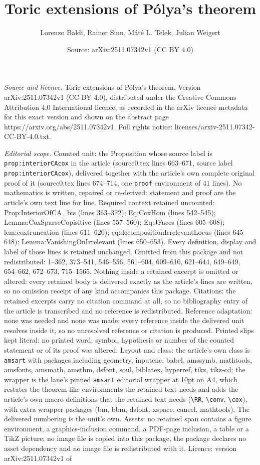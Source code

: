 \documentclass[10pt,a4paper]{amsart}
\title[Toric extensions of P\'olya's theorem]{Toric extensions of P\'olya's theorem}
\author{Lorenzo Baldi, Rainer Sinn, M\'at\'e L. Telek, Julian Weigert}
\date{Source: arXiv:2511.07342v1 (CC BY 4.0)}
\begin{document}
\maketitle

\noindent\emph{Source and licence.} Toric extensions of P\'olya's theorem. Version arXiv:2511.07342v1 (CC BY 4.0), distributed under the Creative Commons Attribution 4.0 International licence, as recorded in the arXiv licence metadata for this exact version and shown on the abstract page https://arxiv.org/abs/2511.07342v1. Full rights notice: licenses/arxiv-2511.07342-CC-BY-4.0.txt.\par\smallskip

\noindent\textit{Editorial scope.} Counted unit: the Proposition whose source label is \texttt{prop:interiorCAcox} in the article (source0.tex lines 663--671, source label \texttt{prop:interiorCAcox}), delivered together with the article's own complete original proof of it (source0.tex lines 674--714, one \texttt{proof} environment of 41 lines). No mathematics is written, repaired or re-derived: statement and proof are the article's own text line for line. Required context retained uncounted: Prop:InteriorOfCA\_bis (lines 363--372); Eq:CoxHom (lines 542--545); Lemma:CoxSparseCopisitive (lines 557--560); Eq:JFaces (lines 605--608); lem:coxtruncation (lines 611--620); eq:decompositionIrrelevantLocus (lines 645--648); Lemma:VanishingOnIrrelevant (lines 650--653). Every definition, display and label of those lines is retained unchanged. Omitted from this package and not redistributed: 1--362, 373--541, 546--556, 561--604, 609--610, 621--644, 649--649, 654--662, 672--673, 715--1565. Nothing inside a retained excerpt is omitted or altered: every retained body is delivered exactly as the article's lines are written, so no omission receipt of any kind accompanies this package. Citations: the retained excerpts carry no citation command at all, so no bibliography entry of the article is transcribed and no reference is redistributed. Reference adaptation: none was needed and none was made; every reference inside the delivered unit resolves inside it, so no unresolved reference or citation is produced. Printed slips kept literal: no printed word, symbol, hypothesis or number of the counted statement or of its proof was altered. Layout and class: the article's own class is \texttt{amsart} with packages including geometry, inputenc, babel, amssymb, mathtools, amsfonts, amsmath, amsthm, dsfont, soul, biblatex, hyperref, tikz, tikz-cd; the wrapper is the lane's pinned \texttt{amsart} editorial wrapper at 10pt on A4, which restates the theorem-like environments the retained text needs and adds the article's own macro definitions that the retained text needs (\texttt{\textbackslash RR}, \texttt{\textbackslash conv}, \texttt{\textbackslash cox}), with extra wrapper packages (bm, bbm, dsfont, xspace, cancel, mathtools). The delivered numbering is the unit's own. Assets: no retained span contains a figure environment, a graphics-inclusion command, a PDF-page inclusion, a table or a TikZ picture; no image file is copied into this package, the package declares no asset dependency and no image file is redistributed with it. Licence: version arXiv:2511.07342v1 of 
\end{document}
